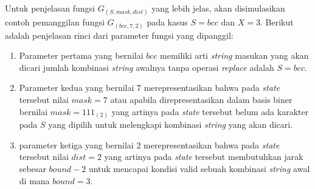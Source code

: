 Untuk penjelasan fungsi $ G_{(S, mask, dist)} $ yang lebih jelas, akan disimulasikan contoh pemanggilan fungsi $ G_{(bcc, 7, 2)} $ pada kasus $ S=bcc $ dan $ X=3 $. Berikut adalah penjelasan rinci dari parameter fungsi yang dipanggil:

\begin{enumerate}
	\item Parameter pertama yang bernilai $ bcc $ memiliki arti \textit{string} masukan yang akan dicari jumlah kombinasi \textit{string} awalnya tanpa operasi \textit{replace} adalah $ S=bcc $.
	\item Parameter kedua yang bernilai $ 7 $ merepresentasikan bahwa pada \textit{state} tersebut nilai $ mask = 7 $ atau apabila direpresentasikan dalam basis biner bernilai $ mask = 111_{(2)} $ yang artinya pada \textit{state} tersebut belum ada karakter pada $ S $ yang dipilih untuk melengkapi kombinasi \textit{string} yang akan dicari.
	\item parameter ketiga yang bernilai $ 2 $ merepresentasikan bahwa pada \textit{state} tersebut nilai $ dist = 2 $ yang artinya pada \textit{state} tersebut membutuhkan jarak sebesar $ bound - 2$ untuk mencapai kondisi valid sebuah kombinasi \textit{string} awal di mana $ bound=3 $.
\end{enumerate}

